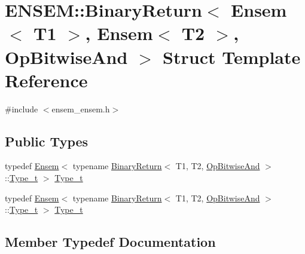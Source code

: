 \hypertarget{structENSEM_1_1BinaryReturn_3_01Ensem_3_01T1_01_4_00_01Ensem_3_01T2_01_4_00_01OpBitwiseAnd_01_4}{}\section{E\+N\+S\+EM\+:\+:Binary\+Return$<$ Ensem$<$ T1 $>$, Ensem$<$ T2 $>$, Op\+Bitwise\+And $>$ Struct Template Reference}
\label{structENSEM_1_1BinaryReturn_3_01Ensem_3_01T1_01_4_00_01Ensem_3_01T2_01_4_00_01OpBitwiseAnd_01_4}


{\ttfamily \#include $<$ensem\+\_\+ensem.\+h$>$}

\subsection*{Public Types}
\begin{DoxyCompactItemize}
\item 
typedef \mbox{\hyperlink{classENSEM_1_1Ensem}{Ensem}}$<$ typename \mbox{\hyperlink{structENSEM_1_1BinaryReturn}{Binary\+Return}}$<$ T1, T2, \mbox{\hyperlink{structENSEM_1_1OpBitwiseAnd}{Op\+Bitwise\+And}} $>$\+::\mbox{\hyperlink{structENSEM_1_1BinaryReturn_3_01Ensem_3_01T1_01_4_00_01Ensem_3_01T2_01_4_00_01OpBitwiseAnd_01_4_ae57c0a7872aa25995d533ea71691c128}{Type\+\_\+t}} $>$ \mbox{\hyperlink{structENSEM_1_1BinaryReturn_3_01Ensem_3_01T1_01_4_00_01Ensem_3_01T2_01_4_00_01OpBitwiseAnd_01_4_ae57c0a7872aa25995d533ea71691c128}{Type\+\_\+t}}
\item 
typedef \mbox{\hyperlink{classENSEM_1_1Ensem}{Ensem}}$<$ typename \mbox{\hyperlink{structENSEM_1_1BinaryReturn}{Binary\+Return}}$<$ T1, T2, \mbox{\hyperlink{structENSEM_1_1OpBitwiseAnd}{Op\+Bitwise\+And}} $>$\+::\mbox{\hyperlink{structENSEM_1_1BinaryReturn_3_01Ensem_3_01T1_01_4_00_01Ensem_3_01T2_01_4_00_01OpBitwiseAnd_01_4_ae57c0a7872aa25995d533ea71691c128}{Type\+\_\+t}} $>$ \mbox{\hyperlink{structENSEM_1_1BinaryReturn_3_01Ensem_3_01T1_01_4_00_01Ensem_3_01T2_01_4_00_01OpBitwiseAnd_01_4_ae57c0a7872aa25995d533ea71691c128}{Type\+\_\+t}}
\end{DoxyCompactItemize}


\subsection{Member Typedef Documentation}
\mbox{\label{structENSEM_1_1BinaryReturn_3_01Ensem_3_01T1_01_4_00_01Ensem_3_01T2_01_4_00_01OpBitwiseAnd_01_4_ae57c0a7872aa25995d533ea71691c128}} 
